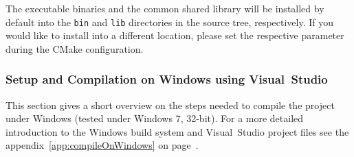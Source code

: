 The executable binaries and the common shared library will be installed by default into the
\texttt{bin} and \texttt{lib} directories in the source tree,
respectively. If you would like to install into a different location,
please set the respective parameter during the CMake configuration.

\subsubsection{Setup and Compilation on Windows using Visual~Studio}

This section gives a short overview on the steps needed to compile the
project under Windows (tested under Windows 7, 32-bit). For a more
detailed introduction to the Windows build system and Visual~Studio
project files see the appendix~\ref{app:compileOnWindows} on
page~\pageref{app:compileOnWindows}.

